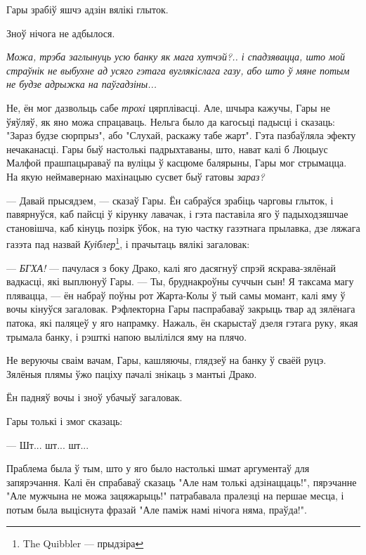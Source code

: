 Гары зрабіў яшчэ адзін вялікі глыток.

Зноў нічога не адбылося.

\emph{Можа, трэба заглынуць усю банку як мага хутчэй?.. і спадзявацца, што мой
страўнік не выбухне ад усяго гэтага вуглякіслага газу, або што ў мяне потым не 
будзе адрыжка на паўгадзіны...}

Не, ён мог дазвольць сабе \emph{трохі} цярплівасці. Але, шчыра кажучы, Гары
не ўяўляў, як яно можа спрацаваць. Нельга было да кагосьці падысці і сказаць:
"Зараз будзе сюрпрыз", або "Слухай, раскажу табе жарт". Гэта пазбаўляла эфекту 
нечаканасці. Гары быў настолькі падрыхтаваны, што, нават калі б Люцыус Малфой
прашпацыраваў па вуліцы ў касцюме балярыны, Гары  мог стрымацца.
На якую неймавернаю махінацыю сусвет быў гатовы \emph{зараз?}
 
--- Давай прысядзем, --- сказаў Гары. Ён сабраўся зрабіць чарговы глыток, і павярнуўся,
каб пайсці ў кірунку лавачак, і гэта паставіла яго ў падыходзяшчае становішча, 
каб кінуць позірк ўбок, на тую частку газэтнага прылавка, дзе ляжага газэта 
пад назвай \emph{Куіблер}\footnote{The Quibbler --- прыдзіра}, і прачытаць
вялікі загаловак:


--- \emph{БГХА!} --- пачулася з боку Драко, калі яго дасягнуў спрэй яскрава-зялёнай
вадкасці, які выплюнуў Гары. --- Ты, бруднакроўны суччын сын! Я таксама магу плявацца, ---
ён набраў поўны рот Жарта-Колы ў тый самы момант, калі яму ў вочы кінуўся загаловак.
Рэфлекторна Гары паспрабаваў закрыць твар ад зялёнага патока, які паляцеў у яго напрамку.
Нажаль, ён скарыстаў дзеля гэтага руку, якая трымала банку, і рэшткі напою 
вылілілся яму на плячо.

Не веруючы сваім вачам, Гары, кашляючы, глядзеў на банку ў сваёй руцэ.
Зялёныя плямы ўжо паціху пачалі знікаць з мантыі Драко.

Ён падняў вочы і зноў убачыў загаловак.



Гары толькі і змог сказаць:

--- Шт... шт... шт...

Праблема была ў тым, што у яго было настолькі шмат аргументаў для запярэчання. Калі ён спрабаваў
сказаць "Але нам толькі адзінаццаць!", пярэчанне "Але мужчына не можа зацяжарыць!" 
патрабавала пралезці на першае месца, і потым была выціснута фразай 
"Але паміж намі нічога няма, праўда!".

